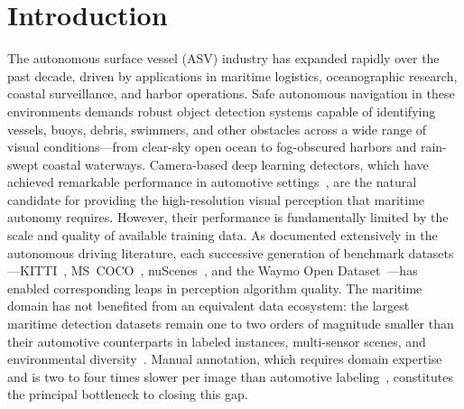 \section{Introduction}
\label{sec:introduction}

The autonomous surface vessel (ASV) industry has expanded rapidly over the past decade, driven by applications in maritime logistics, oceanographic research, coastal surveillance, and harbor operations. Safe autonomous navigation in these environments demands robust object detection systems capable of identifying vessels, buoys, debris, swimmers, and other obstacles across a wide range of visual conditions---from clear-sky open ocean to fog-obscured harbors and rain-swept coastal waterways. Camera-based deep learning detectors, which have achieved remarkable performance in automotive settings~\cite{Sun2020Waymo,Caesar2020nuScenes}, are the natural candidate for providing the high-resolution visual perception that maritime autonomy requires. However, their performance is fundamentally limited by the scale and quality of available training data. As documented extensively in the autonomous driving literature, each successive generation of benchmark datasets---KITTI~\cite{Geiger2012KITTI}, MS~COCO~\cite{Lin2014COCO}, nuScenes~\cite{Caesar2020nuScenes}, and the Waymo Open Dataset~\cite{Sun2020Waymo}---has enabled corresponding leaps in perception algorithm quality. The maritime domain has not benefited from an equivalent data ecosystem: the largest maritime detection datasets remain one to two orders of magnitude smaller than their automotive counterparts in labeled instances, multi-sensor scenes, and environmental diversity~\cite{Nanda2024KOLOMVERSE,Choi2024PoLaRIS,Jang2024MOANA}. Manual annotation, which requires domain expertise and is two to four times slower per image than automotive labeling~\cite{Bovcon2019MaSTr1325,Zhang2021MarineDetectionSurvey}, constitutes the principal bottleneck to closing this gap.

